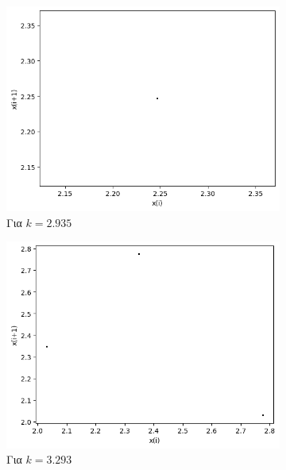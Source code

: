 \begin{figure}[ht]
	\centering
	\begin{subfigure}[b]{0.4\textwidth}
		\centering
		\includegraphics[width=\textwidth]{LateX images/sine q=-0.3/g8}
		\caption{Για $k=2.935$}
		\label{f:k121}
	\end{subfigure}
	\hfill
	\begin{subfigure}[b]{0.4\textwidth}
		\centering
		\includegraphics[width=\textwidth]{LateX images/sine q=-0.3/g9}
		\caption{Για $k=3.293$}
		\label{f:k122}
	\end{subfigure}
	\hfill
	\begin{subfigure}[b]{0.4\textwidth}
		\centering

\end{subfigure}
\end{figure}
